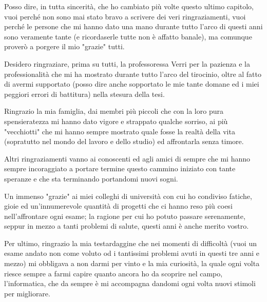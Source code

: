 
Posso dire, in tutta sincerit\`a, che ho cambiato pi\`u volte questo ultimo capitolo, vuoi perch\'e non sono mai stato bravo a scrivere dei veri ringraziamenti, vuoi perch\'e le persone che mi hanno dato una mano durante tutto l'arco di questi anni sono veramente tante (e ricordaserle tutte non \`e affatto banale), ma comunque prover\`o a porgere il mio "grazie" tutti.
\vspace{3mm}

Desidero ringraziare, prima su tutti, la professoressa Verri per la pazienza e la professionalit\`a che mi ha mostrato durante tutto l'arco del tirocinio, oltre al fatto di avermi supportato (posso dire anche sopportato le mie tante domane ed i miei peggiori errori di battitura) nella stesura della tesi.
\vspace{3mm}

Ringrazio la mia famiglia, dai membri pi\`u piccoli che con la loro pura spensieratezza mi hanno dato vigore e strappato qualche sorriso, ai pi\`u "vecchiotti" che mi hanno sempre mostrato quale fosse la realt\`a della vita (sopratutto nel mondo del lavoro e dello studio) ed affrontarla senza timore.
\vspace{3mm}

Altri ringraziamenti vanno ai conoscenti ed agli amici di sempre che mi hanno sempre incoraggiato a portare termine questo cammino iniziato con tante speranze e che sta terminando portandomi nuovi sogni.
\vspace{3mm}

Un immenso "grazie" ai miei colleghi di universit\`a con cui ho condiviso fatiche, gioie ed un'innumerevole quantit\`a di progetti che ci hanno reso pi\`u coesi nell'affrontare ogni esame; la ragione per cui ho potuto passare serenamente, seppur in mezzo a tanti problemi di salute, questi anni \`e anche merito vostro.
\vspace{3mm}

Per ultimo, ringrazio la mia testardaggine che nei momenti di difficolt\`a (vuoi un esame andato non come voluto od i tantissimi problemi avuti in questi tre anni e mezzo) mi obbligava a non darmi per vinto e la mia curiosit\`a, la quale ogni volta riesce sempre a farmi capire quanto ancora ho da scoprire nel campo, l'informatica, che da sempre \`e mi accompagna dandomi ogni volta nuovi stimoli per migliorare.
\newpage